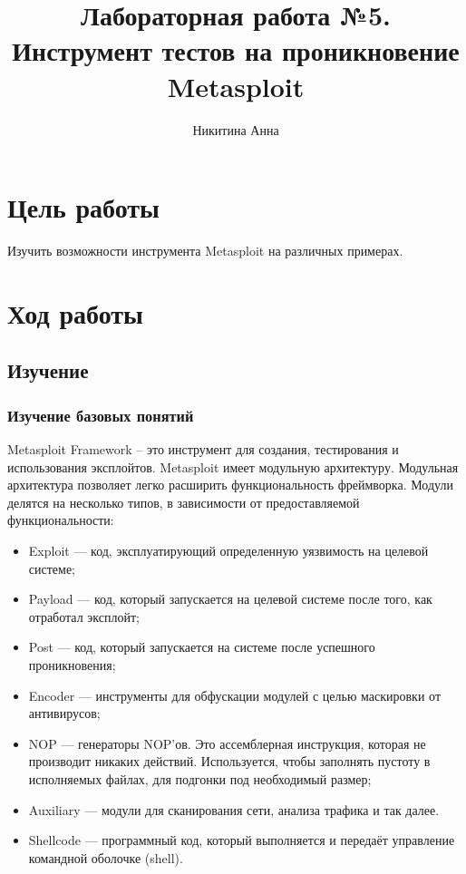 \documentclass[10pt,a4paper]{report}
\author{Никитина Анна}
\title{Лабораторная работа №5.\\
	Инструмент тестов на проникновение Metasploit}
\begin{document}
\maketitle
\tableofcontents
\pagebreak

\section{Цель работы}
Изучить возможности инструмента  Metasploit на различных примерах.
\section{Ход работы}
\subsection{Изучение}
\subsubsection{Изучение базовых понятий}
Metasploit Framework – это инструмент для создания, тестирования и использования эксплойтов. Metasploit имеет модульную архитектуру. Модульная архитектура позволяет легко расширить функциональность фреймворка. Модули делятся на несколько типов, в зависимости от предоставляемой функциональности:
\begin{itemize}
\item Exploit — код, эксплуатирующий определенную уязвимость на целевой системе;
\item Payload — код, который запускается на целевой системе после того, как отработал эксплойт;
\item Post — код, который запускается на системе после успешного проникновения;
\item Encoder — инструменты для обфускации модулей с целью маскировки от антивирусов;
\item NOP — генераторы NOP’ов. Это ассемблерная инструкция, которая не производит никаких действий. Используется, чтобы заполнять пустоту в исполняемых файлах, для подгонки под необходимый размер;
\item Auxiliary — модули для сканирования сети, анализа трафика и так далее.
\item Shellcode — программный код, который выполняется и передаёт управление командной оболочке (shell). 
\end{itemize}
\end{document}
